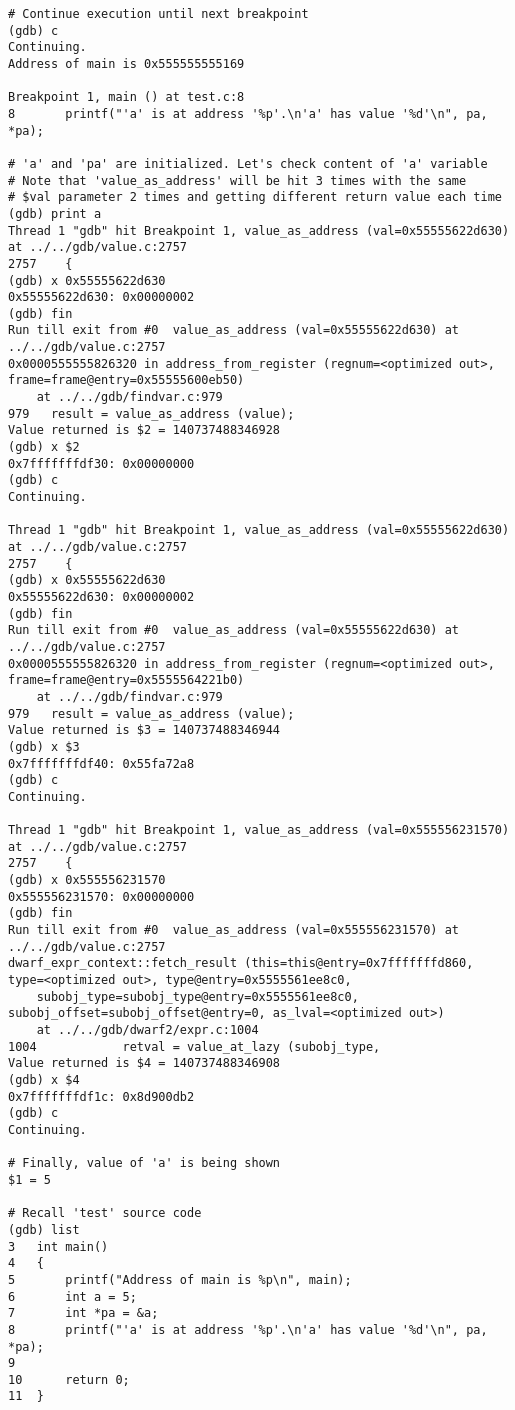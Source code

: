 \documentclass{report}
\begin{document}
\begin{verbatim}
# Continue execution until next breakpoint
(gdb) c
Continuing.
Address of main is 0x555555555169

Breakpoint 1, main () at test.c:8
8		printf("'a' is at address '%p'.\n'a' has value '%d'\n", pa, *pa);

# 'a' and 'pa' are initialized. Let's check content of 'a' variable
# Note that 'value_as_address' will be hit 3 times with the same
# $val parameter 2 times and getting different return value each time
(gdb) print a
Thread 1 "gdb" hit Breakpoint 1, value_as_address (val=0x55555622d630) at ../../gdb/value.c:2757
2757	{
(gdb) x 0x55555622d630
0x55555622d630:	0x00000002
(gdb) fin
Run till exit from #0  value_as_address (val=0x55555622d630) at ../../gdb/value.c:2757
0x0000555555826320 in address_from_register (regnum=<optimized out>, frame=frame@entry=0x55555600eb50)
    at ../../gdb/findvar.c:979
979	  result = value_as_address (value);
Value returned is $2 = 140737488346928
(gdb) x $2
0x7fffffffdf30:	0x00000000
(gdb) c
Continuing.

Thread 1 "gdb" hit Breakpoint 1, value_as_address (val=0x55555622d630) at ../../gdb/value.c:2757
2757	{
(gdb) x 0x55555622d630
0x55555622d630:	0x00000002
(gdb) fin
Run till exit from #0  value_as_address (val=0x55555622d630) at ../../gdb/value.c:2757
0x0000555555826320 in address_from_register (regnum=<optimized out>, frame=frame@entry=0x5555564221b0)
    at ../../gdb/findvar.c:979
979	  result = value_as_address (value);
Value returned is $3 = 140737488346944
(gdb) x $3
0x7fffffffdf40:	0x55fa72a8
(gdb) c
Continuing.

Thread 1 "gdb" hit Breakpoint 1, value_as_address (val=0x555556231570) at ../../gdb/value.c:2757
2757	{
(gdb) x 0x555556231570
0x555556231570:	0x00000000
(gdb) fin
Run till exit from #0  value_as_address (val=0x555556231570) at ../../gdb/value.c:2757
dwarf_expr_context::fetch_result (this=this@entry=0x7fffffffd860, type=<optimized out>, type@entry=0x5555561ee8c0, 
    subobj_type=subobj_type@entry=0x5555561ee8c0, subobj_offset=subobj_offset@entry=0, as_lval=<optimized out>)
    at ../../gdb/dwarf2/expr.c:1004
1004		    retval = value_at_lazy (subobj_type,
Value returned is $4 = 140737488346908
(gdb) x $4
0x7fffffffdf1c:	0x8d900db2
(gdb) c
Continuing.

# Finally, value of 'a' is being shown
$1 = 5

# Recall 'test' source code
(gdb) list
3	int main()
4	{
5		printf("Address of main is %p\n", main);
6		int a = 5;
7		int *pa = &a;
8		printf("'a' is at address '%p'.\n'a' has value '%d'\n", pa, *pa);
9	
10		return 0;
11	}


\end{verbatim}
\end{document}

